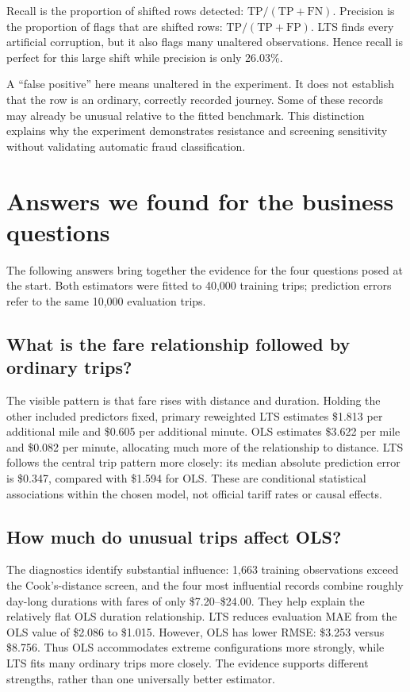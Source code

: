 \documentclass[11pt,letterpaper]{article}
\begin{document}
Recall is the proportion of shifted rows detected: $\mathrm{TP}/(\mathrm{TP}+\mathrm{FN})$. Precision is the proportion of flags that are shifted rows: $\mathrm{TP}/(\mathrm{TP}+\mathrm{FP})$. LTS finds every artificial corruption, but it also flags many unaltered observations. Hence recall is perfect for this large shift while precision is only 26.03\%.

A ``false positive'' here means unaltered in the experiment. It does not establish that the row is an ordinary, correctly recorded journey. Some of these records may already be unusual relative to the fitted benchmark. This distinction explains why the experiment demonstrates resistance and screening sensitivity without validating automatic fraud classification.

\clearpage
\section{Answers we found for the business questions}
The following answers bring together the evidence for the four questions posed at the start. Both estimators were fitted to 40,000 training trips; prediction errors refer to the same 10,000 evaluation trips.

\subsection{What is the fare relationship followed by ordinary trips?}
The visible pattern is that fare rises with distance and duration. Holding the other included predictors fixed, primary reweighted LTS estimates \$1.813 per additional mile and \$0.605 per additional minute. OLS estimates \$3.622 per mile and \$0.082 per minute, allocating much more of the relationship to distance. LTS follows the central trip pattern more closely: its median absolute prediction error is \$0.347, compared with \$1.594 for OLS. These are conditional statistical associations within the chosen model, not official tariff rates or causal effects.

\subsection{How much do unusual trips affect OLS?}
The diagnostics identify substantial influence: 1,663 training observations exceed the Cook's-distance screen, and the four most influential records combine roughly day-long durations with fares of only \$7.20--\$24.00. They help explain the relatively flat OLS duration relationship. LTS reduces evaluation MAE from the OLS value of \$2.086 to \$1.015. However, OLS has lower RMSE: \$3.253 versus \$8.756. Thus OLS accommodates extreme configurations more strongly, while LTS fits many ordinary trips more closely. The evidence supports different strengths, rather than one universally better estimator.
\end{document}
